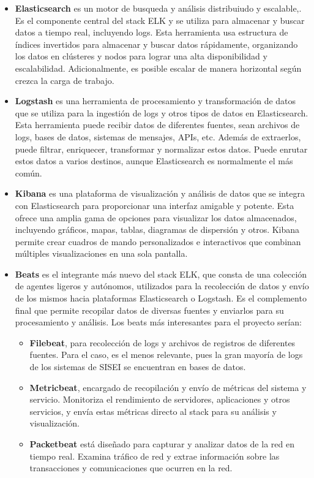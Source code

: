 \begin{itemize}
  \item \textbf{Elasticsearch} es un motor de busqueda y análisis distribuiudo y escalable,. Es el componente central del stack ELK y se utiliza para almacenar y buscar datos a tiempo real, incluyendo logs. Esta herramienta usa estructura de índices invertidos para almacenar y buscar datos rápidamente, organizando los datos en clústeres y nodos para lograr una alta disponibilidad y escalabilidad. Adicionalmente, es posible escalar de manera horizontal según crezca la carga de trabajo.
  \item \textbf{Logstash} es una herramienta de procesamiento y transformación de datos que se utiliza para la ingestión de logs y otros tipos de datos en Elasticsearch. Esta herramienta puede recibir datos de diferentes fuentes, sean archivos de logs, bases de datos, sistemas de mensajes, APIs, etc. Además de extraerlos, puede filtrar, enriquecer, transformar y normalizar estos datos. Puede enrutar estos datos a varios destinos, aunque Elasticsearch es normalmente el más común.
  \item \textbf{Kibana} es una plataforma de visualización y análisis de datos que se integra con Elasticsearch para proporcionar una interfaz amigable y potente. Esta ofrece una amplia gama de opciones para visualizar los datos almacenados, incluyendo gráficos, mapas, tablas, diagramas de dispersión y otros. Kibana permite crear cuadros de mando personalizados e interactivos que combinan múltiples visualizaciones en una sola pantalla.
  \item \textbf{Beats} es el integrante más nuevo del stack ELK, que consta de una colección de agentes ligeros y autónomos, utilizados para la recolección de datos y envío de los mismos hacia plataformas Elasticsearch o Logstash. Es el complemento final que permite recopilar datos de diversas fuentes y enviarlos para su procesamiento y análisis. Los beats más interesantes para el proyecto serían:
  \begin{itemize}
    \item \textbf{Filebeat}, para recolección de logs y archivos de registros de diferentes fuentes. Para el caso, es el menos relevante, pues la gran mayoría de logs de los sistemas de SISEI se encuentran en bases de datos.
    \item \textbf{Metricbeat}, encargado de recopilación y envío de métricas del sistema y servicio. Monitoriza el rendimiento de servidores, aplicaciones y otros servicios, y envía estas métricas directo al stack para su análisis y visualización.
    \item \textbf{Packetbeat} está diseñado para capturar y analizar datos de la red en tiempo real. Examina tráfico de red y extrae información sobre las transacciones y comunicaciones que ocurren en la red.
  \end{itemize}
\end{itemize}

